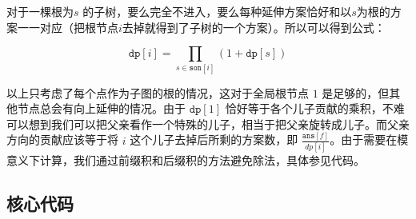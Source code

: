 对于一棵根为$s$ 的子树，要么完全不进入，要么每种延伸方案恰好和以$s$为根的方案一一对应（把根节点$i$去掉就得到了子树的一个方案）。所以可以得到公式：

$$
\texttt{dp}[i] = \prod_{s\in \texttt{son}[i]} (1+\texttt{dp}[s])
$$

以上只考虑了每个点作为子图的根的情况，这对于全局根节点 $1$ 是足够的，但其他节点总会有向上延伸的情况。由于 $\texttt{dp}[1]$ 恰好等于各个儿子贡献的乘积，不难可以想到我们可以把父亲看作一个特殊的儿子，相当于把父亲旋转成儿子。而父亲方向的贡献应该等于将 $i$ 这个儿子去掉后所剩的方案数，即 $\displaystyle \frac{\texttt{ans}[f]}{dp[i]}$。由于需要在模意义下计算，我们通过前缀积和后缀积的方法避免除法，具体参见代码。





\subsection*{核心代码}
\inputminted[linenos,autogobble]{cpp}{./Code/V.cpp}
\newpage